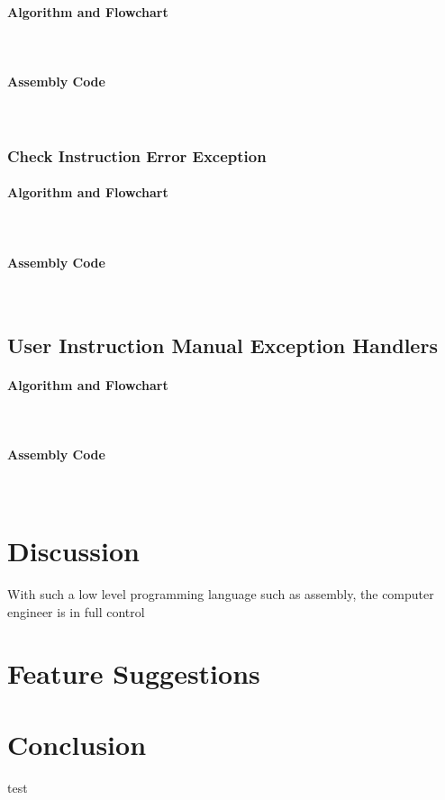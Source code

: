 \documentclass[12pt]{article}
\begin{document}
			\paragraph{Algorithm and Flowchart}~\\
			\paragraph{Assembly Code}~\\		
			
			\subsubsection{Check Instruction Error Exception}
			\paragraph{Algorithm and Flowchart}~\\
			\paragraph{Assembly Code}~\\			
			
			\subsection{User Instruction Manual Exception Handlers}
			\paragraph{Algorithm and Flowchart}~\\
			\paragraph{Assembly Code}~\\
			
			\section{Discussion}
			With such a low level programming language such as assembly, the computer engineer is in full control 
			\section{Feature Suggestions}
			
			\section{Conclusion}
			
			\begin{thebibliography}{1}
				 test
			\end{thebibliography}
\end{document}

